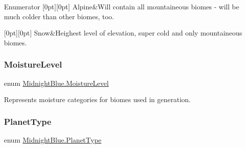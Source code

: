 \begin{DoxyEnumFields}{Enumerator}
[0pt][0pt]{}\hypertarget{namespace_midnight_blue_a86f8aaa0bbb651a6a094d3eb95f799e0a45a94c5ae2df00c49cca09d7d26c06ec}{}\label{namespace_midnight_blue_a86f8aaa0bbb651a6a094d3eb95f799e0a45a94c5ae2df00c49cca09d7d26c06ec} 
Alpine&Will contain all mountaineous biomes -\/ will be much colder than other biomes, too. \\
\hline

[0pt][0pt]{}\hypertarget{namespace_midnight_blue_a86f8aaa0bbb651a6a094d3eb95f799e0ab46d3c8ee8032551c011745d587705cc}{}\label{namespace_midnight_blue_a86f8aaa0bbb651a6a094d3eb95f799e0ab46d3c8ee8032551c011745d587705cc} 
Snow&Heighest level of elevation, super cold and only mountaineous biomes. \\
\hline

\end{DoxyEnumFields}
\hypertarget{namespace_midnight_blue_a7428767e7fc0b52bab6cb270f8354e1d}{}\label{namespace_midnight_blue_a7428767e7fc0b52bab6cb270f8354e1d} 
\subsubsection{\texorpdfstring{Moisture\+Level}{MoistureLevel}}
{\footnotesize\ttfamily enum \hyperlink{namespace_midnight_blue_a7428767e7fc0b52bab6cb270f8354e1d}{Midnight\+Blue.\+Moisture\+Level}\hspace{0.3cm}{\ttfamily [strong]}}



Represents moisture categories for biomes used in generation. 

\hypertarget{namespace_midnight_blue_a4a799009a18b57979628708589ae53e3}{}\label{namespace_midnight_blue_a4a799009a18b57979628708589ae53e3} 
\subsubsection{\texorpdfstring{Planet\+Type}{PlanetType}}
{\footnotesize\ttfamily enum \hyperlink{namespace_midnight_blue_a4a799009a18b57979628708589ae53e3}{Midnight\+Blue.\+Planet\+Type}\hspace{0.3cm}{\ttfamily [strong]}}



